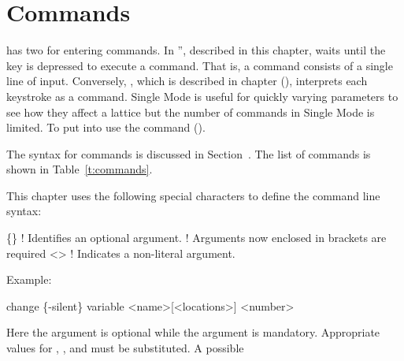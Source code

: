 %

\chapter{Commands}
\label{c:command}

\tao has two  for entering commands. In '', described in this chapter, \tao
waits until the  key is depressed to execute a command. That is, a command consists of a
single line of input. Conversely, , which is described in  chapter
(), interprets each keystroke as a command. Single Mode is useful for quickly varying
parameters to see how they affect a lattice but the number of commands in Single Mode is limited. To
put \tao into  use the  command ().

The syntax for  commands is discussed in Section~. The list of
commands is shown in Table~\ref{t:commands}.

This chapter uses the following special characters to define the command line syntax:
\begin{example}
  \{\}        ! Identifies an optional argument.
            !   Arguments now enclosed in brackets are required
  <>        ! Indicates a non-literal argument.
\end{example}

Example:
\begin{example}
  change \{-silent\} variable <name>[<locations>] <number>
\end{example}
Here the  argument is optional while the  argument is mandatory.
Appropriate values for , , and  must be substituted. A
possible

